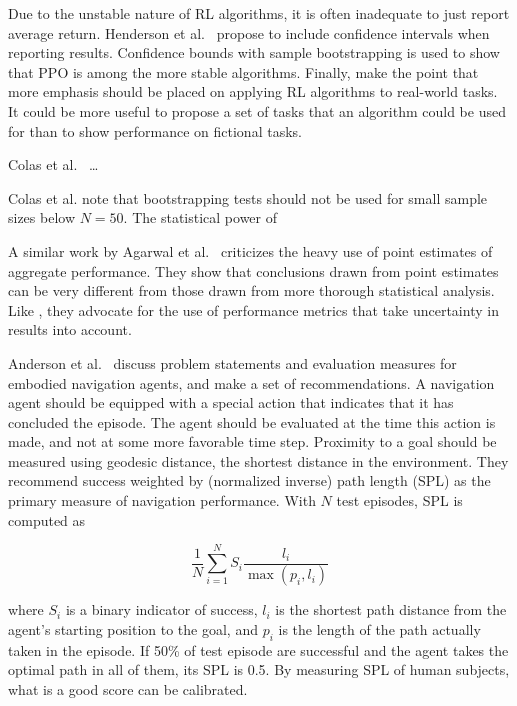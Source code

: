 Due to the unstable nature of RL algorithms, it is often inadequate to just report average return.
Henderson et al.~\cite{henderson_matters_2018} propose to include confidence intervals when reporting results.
Confidence bounds with sample bootstrapping is used to show that PPO is among the more stable algorithms.
Finally, \cite{henderson_matters_2018} make the point that more emphasis should be placed on applying RL algorithms to real-world tasks.
It could be more useful to propose a set of tasks that an algorithm could be used for than to show performance on fictional tasks.

Colas et al. ~\cite{colas_seeds_2018}\dots

Colas et al.\cite{colas_hitchhiker_2019} note that bootstrapping tests should not be used for small sample sizes below \(N = 50\).
The statistical power of 

A similar work by Agarwal et al.~\cite{agarwal_rlliable_2022} criticizes the heavy use of point estimates of aggregate performance.
They show that conclusions drawn from point estimates can be very different from those drawn from more thorough statistical analysis.
Like \cite{henderson_matters_2018}, they advocate for the use  of performance metrics that take uncertainty in results into account.

Anderson et al.~\cite{anderson_evaluation_2018} discuss problem statements and evaluation measures for embodied navigation agents, and make a set of recommendations.
A navigation agent should be equipped with a special action that indicates that it has concluded the episode.
The agent should be evaluated at the time this action is made, and not at some more favorable time step.
Proximity to a goal should be measured using geodesic distance, the shortest distance in the environment.
They recommend success weighted by (normalized inverse) path length (SPL) as the primary measure of navigation performance.
With \(N\) test episodes, SPL is computed as 

\begin{equation}
    \frac{1}{N} \sum_{i=1}^N S_i \frac{l_i}{\max(p_i, l_i)}
\end{equation}

where \(S_i\) is a binary indicator of success,
\(l_i\) is the shortest path distance from the agent's starting position to the goal,
and \(p_i\) is the length of the path actually taken in the episode.
If 50\% of test episode are successful and the agent takes the optimal path in all of them, its SPL is 0.5.
By measuring SPL of human subjects, what is a good score can be calibrated.

